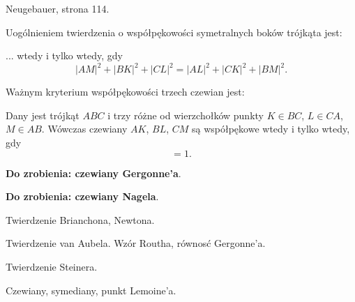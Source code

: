 \begin{proposition}
	Neugebauer, strona 114.
\end{proposition}



Uogólnieniem twierdzenia o współpękowości symetralnych boków trójkąta jest:

\begin{proposition}
	... wtedy i tylko wtedy, gdy
	\begin{equation}
		|AM|^2 + |BK|^2 + |CL|^2 = |AL|^2 + |CK|^2 + |BM|^2.
	\end{equation}
\end{proposition}

Ważnym kryterium współpękowości trzech czewian jest:

\begin{proposition}
	Dany jest trójkąt $ABC$ i trzy różne od wierzchołków punkty $K \in BC$, $L \in CA$, $M \in AB$.
	Wówczas czewiany $AK$, $BL$, $CM$ są współpękowe wtedy i tylko wtedy, gdy
	\begin{equation}
		[AMB] [BKC] [CLA] = 1.
	\end{equation}
\end{proposition}

\textbf{Do zrobienia: czewiany Gergonne'a}.

\textbf{Do zrobienia: czewiany Nagela}.

Twierdzenie Brianchona, Newtona.

Twierdzenie van Aubela.
Wzór Routha, równosć Gergonne'a.

Twierdzenie Steinera.

Czewiany, symediany, punkt Lemoine'a.
